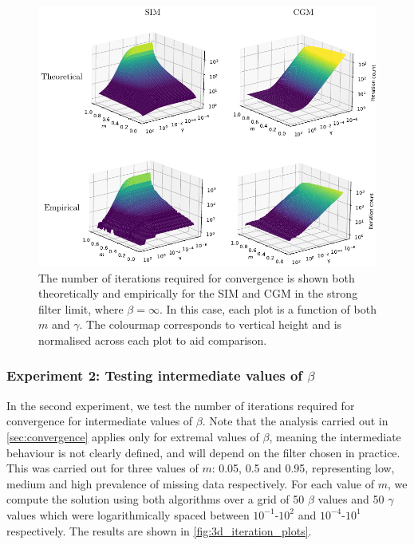\begin{figure}[t]
    \begin{center} 
    \includegraphics[width=\linewidth]{Figures/m_gamma_3d_plot.pdf}
    \end{center}
    \caption[Strong Filter Limit convergence experiments]{\small{The number of iterations required for convergence is shown both theoretically and empirically for the SIM and CGM in the strong filter limit, where $\beta=\infty$. In this case, each plot is a function of both $m$ and $\gamma$. The colourmap corresponds to vertical height and is normalised across each plot to aid comparison. }}
    \label{fig:m_gamma_3d_plot}
\end{figure}


\subsubsection{Experiment 2: Testing intermediate values of \texorpdfstring{$\beta$}{beta}}


In the second experiment, we test the number of iterations required for convergence for intermediate values of $\beta$. Note that the analysis carried out in \cref{sec:convergence} applies only for extremal values of $\beta$, meaning the intermediate behaviour is not clearly defined, and will depend on the filter chosen in practice. This was carried out for three values of $m$: 0.05, 0.5 and 0.95, representing low, medium and high prevalence of missing data respectively. For each value of $m$, we compute the solution using both algorithms over a grid of 50 $\beta$ values and 50 $\gamma$ values which were logarithmically spaced between $10^{-1}$-$10^2$ and $10^{-4}$-$10^1$ respectively. The results are shown in \cref{fig:3d_iteration_plots}. 


